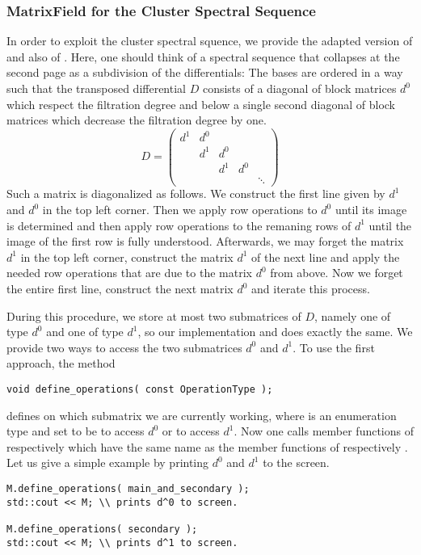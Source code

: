 \subsubsection{MatrixField for the Cluster Spectral Sequence}
In order to exploit the cluster spectral squence, we provide the adapted version  of  and also  of .
Here, one should think of a spectral sequence that collapses at the second page as a subdivision of the differentials:
The bases are ordered in a way such that the transposed differential $D$ consists of a diagonal of block matrices $d^0$ which respect the filtration degree and below a single second diagonal of block matrices which decrease the filtration degree by one.
\[
    D = 
        \begin{pmatrix}
            d^1 & d^0 \\
                & d^1   & d^0 \\
                &       & d^1   & d^0 \\
                &       &       &       & \ddots
        \end{pmatrix}
\]
Such a matrix is diagonalized as follows.
We construct the first line given by $d^1$ and $d^0$ in the top left corner.
Then we apply row operations to $d^0$ until its image is determined and then apply row operations to the remaning rows of $d^1$ until the image of the first row is fully understood.
Afterwards, we may forget the matrix $d^1$ in the top left corner, construct the matrix $d^1$ of the next line and apply the needed row operations that are due to the matrix $d^0$ from above.
Now we forget the entire first line, construct the next matrix $d^0$ and iterate this process.

During this procedure, we store at most two submatrices of $D$, namely one of type $d^0$ and one of type $d^1$, so our implementation  and  does exactly the same.
We provide two ways to access the two submatrices $d^0$ and $d^1$.
To use the first approach, the method
\begin{lstlisting}
void define_operations( const OperationType );
\end{lstlisting}
defines on which submatrix we are currently working, where  is an enumeration type and set to be  to access $d^0$ or  to access $d^1$.
Now one calls member functions of  respectively  which have the same name as the member functions of  respectively .
Let us give a simple example by printing $d^0$ and $d^1$ to the screen.
\begin{lstlisting}
M.define_operations( main_and_secondary );
std::cout << M; \\ prints d^0 to screen.

M.define_operations( secondary );
std::cout << M; \\ prints d^1 to screen.
\end{lstlisting}


